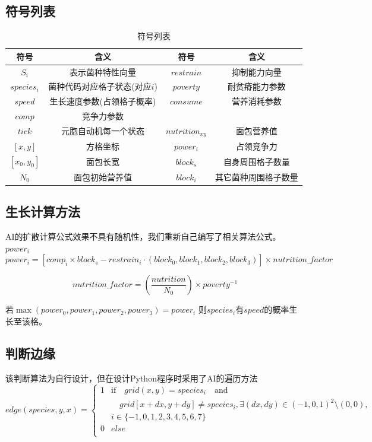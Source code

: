 \documentclass[12pt]{ctexart}
\begin{document}
\subsection{符号列表}
\begin{table}[h]
    \centering
    \caption{符号列表}
    \begin{tabular}{cccc}
        \hline
        符号&含义&符号&含义\\
        \hline
        $S_i$&表示菌种特性向量&$restrain$&抑制能力向量\\
        $species_i$&菌种代码对应格子状态(对应$i$)&$poverty$&耐贫瘠能力参数\\
        $speed$&生长速度参数(占领格子概率)&$consume$&营养消耗参数\\
        $comp$&竞争力参数&&\\
        \hline
        $tick$&元胞自动机每一个状态&$nutrition_{xy}$&面包营养值\\
        $[x,y]$&方格坐标&$power_i$&占领竞争力\\
        $[x_0,y_0]$&面包长宽&$block_s$&自身周围格子数量\\
        $N_0$&面包初始营养值&$block_i$&其它菌种周围格子数量\\
        \hline
    \end{tabular}
\end{table}
\subsection{生长计算方法}
AI的扩散计算公式效果不具有随机性，我们重新自己编写了相关算法公式。
$power_i$
\[power_i=[comp_i\times block_s - restrain_i\cdot (block_0,block_1,block_2,block_3) ] \times nutrition\_factor
\]

\[nutrition\_factor = (\frac{nutrition}{N_0}) \times  poverty^{-1}
\]

若$\max(power_0,power_1,power_2,power_3)=power_i$
则$species_i$有$speed$的概率生长至该格。

\subsection{判断边缘}
该判断算法为自行设计，但在设计Python程序时采用了AI的遍历方法
\[edge(species,y,x)=
\left \{
\begin{array}{ll}
    1& \text{if} \hspace{1em}grid(x,y)=species_i \hspace{1em}\text{and}\\
    &\hspace{1em}grid[x+dx,y+dy]\neq species_i,
    \exists (dx,dy)\in (-1,0,1)^2\setminus (0,0),\\ 
    &i\in \{-1,0,1,2,3,4,5,6,7\}\\
    0&else\\
\end{array}
\right .
\]
\end{document}
